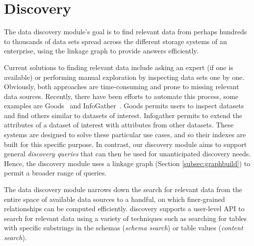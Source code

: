 \section{Discovery}
\label{sec:discovery}

The data discovery module's goal is to find relevant data from perhaps hundreds
to thousands of data sets  spread across the different storage systems of an
enterprise, using the linkage graph to provide answers efficiently.

Current solutions to finding relevant data include asking an expert (if one is
available) or  performing manual exploration by inspecting data sets one by one.
Obviously, both approaches are time-consuming and prone to missing relevant data
sources. Recently, there have been efforts to automate this process, some
examples are Goods~\cite{DBLP:conf/sigmod/HalevyKNOPRW16} and
InfoGather~\cite{DBLP:conf/sigmod/YakoutGCC12}. Goods permits users to inspect
datasets and find others similar to datasets of interest. Infogather permits to
extend the attributes of a dataset of interest with attributes from other
datasets. These systems are designed to solve these particular use cases, and so
their indexes are built for this specific purpose. In
contrast, our discovery module aims to support general \emph{discovery queries} that
can then be used for unanticipated discovery needs. Hence, the discovery module
uses a linkage graph (Section \ref{subsec:graphbuild}) to permit a broader range
of queries. 


%


The data discovery module narrows down the search for relevant data from
the entire space of available data sources to a handful, on which finer-grained
relationships can be computed efficiently. \dcv discovery supports a
user-level API to search for relevant data using a variety of techniques such as
searching for tables with specific substrings in the schemas ({\it schema
search}) or table values ({\it content search}). 

